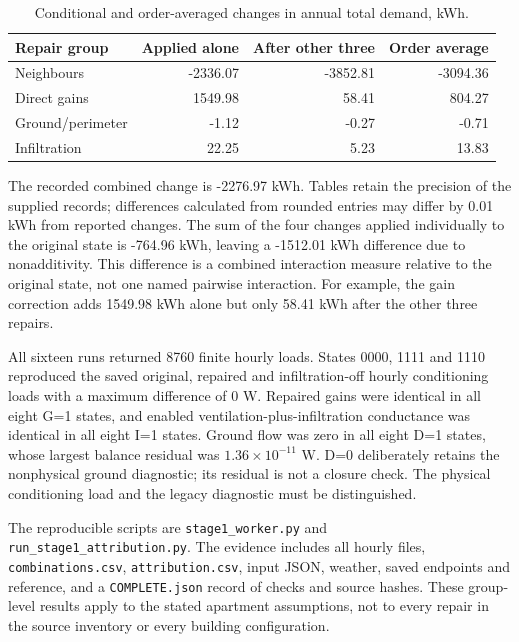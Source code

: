\begin{table}[H]\centering\small
\caption{Conditional and order-averaged changes in annual total demand, kWh.}\label{tab:stage1allocation}
\begin{tabularx}{\linewidth}{@{}Yrrr@{}}\toprule
Repair group & Applied alone & After other three & Order average\\\midrule
Neighbours & -2336.07 & -3852.81 & -3094.36 \\
Direct gains & 1549.98 & 58.41 & 804.27 \\
Ground/perimeter & -1.12 & -0.27 & -0.71 \\
Infiltration & 22.25 & 5.23 & 13.83 \\
\bottomrule\end{tabularx}\end{table}

The recorded combined change is -2276.97 kWh. Tables retain the precision of the supplied records; differences calculated from rounded entries may differ by 0.01 kWh from reported changes. The sum of the four changes applied individually to the original state is -764.96 kWh, leaving a -1512.01 kWh difference due to nonadditivity. This difference is a combined interaction measure relative to the original state, not one named pairwise interaction. For example, the gain correction adds 1549.98 kWh alone but only 58.41 kWh after the other three repairs.

All sixteen runs returned 8760 finite hourly loads. States 0000, 1111 and 1110 reproduced the saved original, repaired and infiltration-off hourly conditioning loads with a maximum difference of 0 W. Repaired gains were identical in all eight G=1 states, and enabled ventilation-plus-infiltration conductance was identical in all eight I=1 states. Ground flow was zero in all eight D=1 states, whose largest balance residual was $1.36\times10^{-11}$ W. D=0 deliberately retains the nonphysical ground diagnostic; its residual is not a closure check. The physical conditioning load and the legacy diagnostic must be distinguished.

The reproducible scripts are \nolinkurl{stage1_worker.py} and \nolinkurl{run_stage1_attribution.py}. The evidence includes all hourly files, \nolinkurl{combinations.csv}, \nolinkurl{attribution.csv}, input JSON, weather, saved endpoints and reference, and a \nolinkurl{COMPLETE.json} record of checks and source hashes. These group-level results apply to the stated apartment assumptions, not to every repair in the source inventory or every building configuration.

